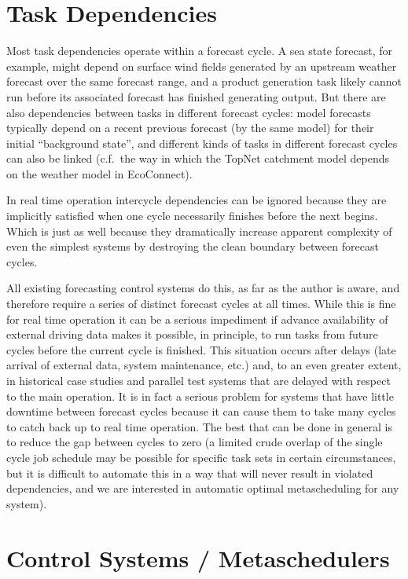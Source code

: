 \documentclass[11pt,a4paper]{article}
\begin{document}
\section{Task Dependencies}

Most task dependencies operate within a forecast cycle. A sea state
forecast, for example, might depend on surface wind fields generated by
an upstream weather forecast over the same forecast range, and a product
generation task likely cannot run before its associated forecast has
finished generating output. But there are also dependencies between
tasks in different forecast cycles: model forecasts typically depend on
a recent previous forecast (by the same model) for their initial
``background state'', and different kinds of tasks in different forecast
cycles can also be linked (c.f.\ the way in which the TopNet catchment
model depends on the weather model in EcoConnect). 

In real time operation intercycle dependencies can be ignored because
they are implicitly satisfied when one cycle necessarily finishes before
the next begins. Which is just as well because they dramatically
increase apparent complexity of even the simplest systems by destroying
the clean boundary between forecast cycles.

All existing forecasting control systems do this, as far as the author
is aware, and therefore require a series of distinct forecast cycles at
all times. While this is fine for real time operation it can be a
serious impediment if advance availability of external driving data
makes it possible, in principle, to run tasks from future cycles before
the current cycle is finished. This situation occurs after delays (late
arrival of external data, system maintenance, etc.) and, to an even
greater extent, in historical case studies and parallel test systems
that are delayed with respect to the main operation. It is in fact a
serious problem for systems that have little downtime between forecast
cycles because it can cause them to take many cycles to catch back up to
real time operation. The best that can be done in general is to reduce
the gap between cycles to zero (a limited crude overlap of the single
cycle job schedule may be possible for specific task sets in certain
circumstances, but it is difficult to automate this in a way that will
never result in violated dependencies, and we are interested in
automatic optimal metascheduling for any system).

\section{Control Systems / Metaschedulers}
\end{document}
